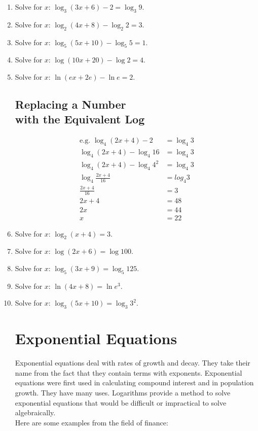 \documentclass[12pt]{article}
\begin{document}
\begin{enumerate}
\item Solve for $x$: $\log_3{(3x+6)}-2 = \log_3{9}$.
\item Solve for $x$: $\log_2{(4x+8)} - \log_2{2} = 3$.
\item Solve for $x$: $\log_5{(5x+10)} - \log_5{5} = 1$.
\item Solve for $x$: $\log{(10x+20)} - \log{2} = 4$.
\item Solve for $x$: $\ln{(ex+2e)} - \ln{e} = 2$.

\subsection*{Replacing a Number\\ with the Equivalent Log}
\begin{align*}
\text{e.g. }\log_4{(2x+4)}-2&=\log_4{3}\\
\log_4{(2x+4)}-\log_4{16}&=\log_4{3}\\
\log_4{(2x+4)}-\log_4{4^2}&=\log_4{3}\\
\log_4\frac{2x+4}{16}&=log_4{3}\\
\frac{2x+4}{16}&=3\\
2x+4&=48\\
2x&=44\\
x&=22
\end{align*}

\item Solve for $x$: $\log_2{(x+4)} = 3$.
\item Solve for $x$: $\log{(2x+6)} = \log{100}$.
\item Solve for $x$: $\log_5{(3x+9)} = \log_5{125}$.
\item Solve for $x$: $\ln{(4x+8)} = \ln{e^3}$.
\item Solve for $x$: $\log_3{(5x+10)} = \log_3{3^2}$.

\section*{Exponential Equations}

Exponential equations deal with rates of growth and decay. They take their name from the fact that they contain terms with exponents. Exponential equations were first used in calculating compound interest and in population growth. They have many uses. Logarithms provide a method to solve exponential equations that would be difficult or impractical to solve algebraically.\\

Here are some examples from the field of finance:\\


\end{enumerate}
\end{document}

